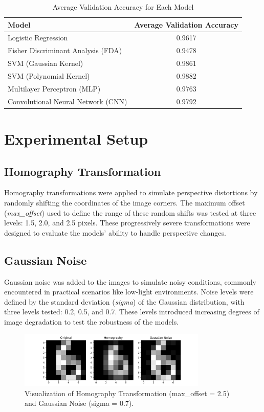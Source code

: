\documentclass{article}
\begin{document}
\begin{table}[h]
    \centering
    \caption{Average Validation Accuracy for Each Model}
    \label{tab:validation_accuracy}
    \begin{tabular}{l c}
        \toprule
        \textbf{Model} & \textbf{Average Validation Accuracy} \\ 
        \midrule
        Logistic Regression & 0.9617 \\ 
        Fisher Discriminant Analysis (FDA) & 0.9478 \\ 
        SVM (Gaussian Kernel) & 0.9861 \\ 
        SVM (Polynomial Kernel) & 0.9882 \\ 
        Multilayer Perceptron (MLP) & 0.9763 \\ 
        Convolutional Neural Network (CNN) & 0.9792 \\ 
        \bottomrule
    \end{tabular}
\end{table}

\section{Experimental Setup}

\subsection{Homography Transformation}
Homography transformations were applied to simulate perspective distortions by randomly shifting the coordinates of the image corners. The maximum offset (\textit{max\_offset}) used to define the range of these random shifts was tested at three levels: 1.5, 2.0, and 2.5 pixels. These progressively severe transformations were designed to evaluate the models' ability to handle perspective changes.

\subsection{Gaussian Noise}
Gaussian noise was added to the images to simulate noisy conditions, commonly encountered in practical scenarios like low-light environments. Noise levels were defined by the standard deviation (\textit{sigma}) of the Gaussian distribution, with three levels tested: 0.2, 0.5, and 0.7. These levels introduced increasing degrees of image degradation to test the robustness of the models.

\begin{figure}[h!]
    \centering
    \includegraphics[width=0.8\textwidth]{images/Experiment.pdf}
    \caption{Visualization of Homography Transformation (max\_offset = 2.5) and Gaussian Noise (sigma = 0.7).}
    \label{fig:experiment_visualization}
\end{figure}
\end{document}
